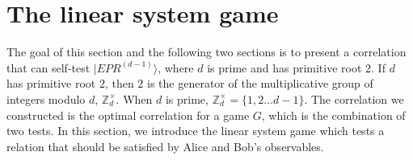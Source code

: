 \documentclass[11pt,letterpaper]{article}
\newcommand{\ket}[1]{|#1\rangle}
\DeclarePairedDelimiter{\set}{\lbrace}{\rbrace}
\DeclarePairedDelimiter{\ip}{\langle}{\rangle}
\newcommand{\Z}{\mathbb{Z}}
\newcommand{\1}{\mathbb{1}}
\newcommand{\J}{\mathcal{J}}
\newcommand{\EPR}[1]{EPR^{(#1)}}
\newcommand{\G}{G}
\newtheorem{definition}[theorem]{Definition}
\theoremstyle{definition}
\begin{document}


\section{The linear system game}
\label{sec:lsg}
The goal of this section and the following two sections is to 
present a correlation that can self-test $\ket{\EPR{d-1}}$, 
where $d$ is prime and has primitive root $2$. 
If $d$ has primitive root $2$,
then $2$ is the generator of the multiplicative group of integers modulo $d$, $\Z_d^\times$.
When $d$ is prime, $\Z_d^\times = \{1,2\dots d-1\}$.
The correlation we constructed is the optimal correlation for a game $\G$, which is the combination of two tests.
In this section, we introduce the linear system game which tests a relation that should be satisfied by 
Alice and Bob's observables.
\end{document}
